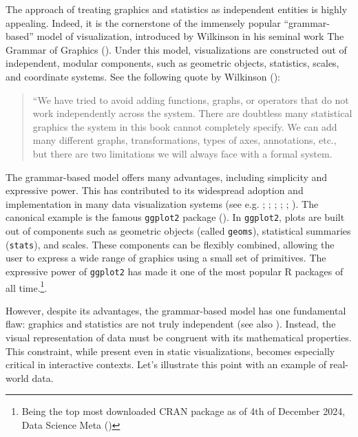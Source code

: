 \documentclass[
]{book}
\theoremstyle{definition}
\theoremstyle{definition}
\theoremstyle{definition}
\theoremstyle{definition}
\theoremstyle{remark}
\begin{document}
The approach of treating graphics and statistics as independent entities is highly appealing. Indeed, it is the cornerstone of the immensely popular ``grammar-based'' model of visualization, introduced by Wilkinson in his seminal work The Grammar of Graphics (). Under this model, visualizations are constructed out of independent, modular components, such as geometric objects, statistics, scales, and coordinate systems. See the following quote by Wilkinson ():

\begin{quote}
``We have tried to avoid adding functions, graphs, or operators that do not work independently across the system. There are doubtless many statistical graphics the system in this book cannot completely specify. We can add many different graphs, transformations, types of axes, annotations, etc., but there are two limitations we will always face with a formal system.
\end{quote}

The grammar-based model offers many advantages, including simplicity and expressive power. This has contributed to its widespread adoption and implementation in many data visualization systems (see e.g. ; ; ; ; ; ). The canonical example is the famous \texttt{ggplot2} package (). In \texttt{ggplot2}, plots are built out of components such as geometric objects (called \texttt{geoms}), statistical summaries (\texttt{stats}), and scales. These components can be flexibly combined, allowing the user to express a wide range of graphics using a small set of primitives. The expressive power of \texttt{ggplot2} has made it one of the most popular R packages of all time.\footnote{Being the top most downloaded CRAN package as of 4th of December 2024, Data Science Meta ()}.

However, despite its advantages, the grammar-based model has one fundamental flaw: graphics and statistics are not truly independent (see also ). Instead, the visual representation of data must be congruent with its mathematical properties. This constraint, while present even in static visualizations, becomes especially critical in interactive contexts. Let's illustrate this point with an example of real-world data.
\end{document}
